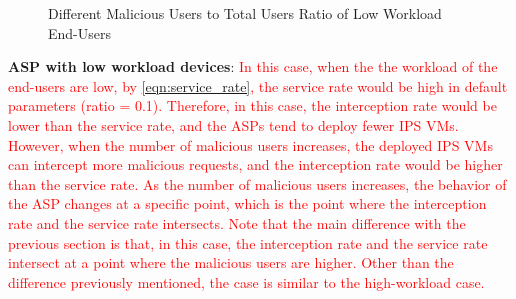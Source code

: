 \documentclass[10pt,journal, compsoc]{IEEEtran}
\begin{document}
\begin{figure}[!]
\captionsetup{justification=centering}
  \hfill
  \hfill
\label{fig:ratio_low}
\caption{Different Malicious Users to Total Users Ratio of Low Workload End-Users}
\end{figure}


\textbf{ASP with low workload devices}: \textcolor{red}{In this case, when the the workload of the end-users are low, by \cref{eqn:service_rate}, the service rate would be high in default parameters (ratio = 0.1). Therefore, in this case, the interception rate would be lower than the service rate, and the ASPs tend to deploy fewer IPS VMs. However, when the number of malicious users increases, the deployed IPS VMs can intercept more malicious requests, and the interception rate would be higher than the service rate. As the number of malicious users increases, the behavior of the ASP changes at a specific point, which is the point where the interception rate and the service rate intersects. Note that the main difference with the previous section is that, in this case, the interception rate and the service rate intersect at a point where the malicious users are higher. Other than the difference previously mentioned, the case is similar to the high-workload case.} 


\end{document}

